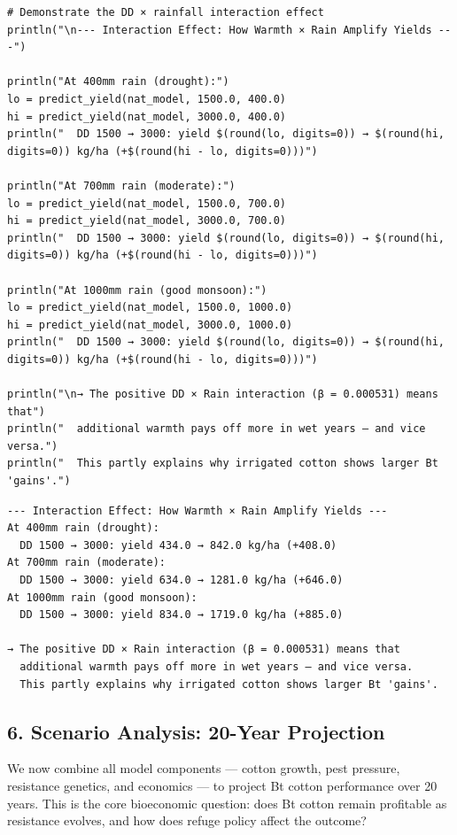 \begin{verbatim}
# Demonstrate the DD × rainfall interaction effect
println("\n--- Interaction Effect: How Warmth × Rain Amplify Yields ---")

println("At 400mm rain (drought):")
lo = predict_yield(nat_model, 1500.0, 400.0)
hi = predict_yield(nat_model, 3000.0, 400.0)
println("  DD 1500 → 3000: yield $(round(lo, digits=0)) → $(round(hi, digits=0)) kg/ha (+$(round(hi - lo, digits=0)))")

println("At 700mm rain (moderate):")
lo = predict_yield(nat_model, 1500.0, 700.0)
hi = predict_yield(nat_model, 3000.0, 700.0)
println("  DD 1500 → 3000: yield $(round(lo, digits=0)) → $(round(hi, digits=0)) kg/ha (+$(round(hi - lo, digits=0)))")

println("At 1000mm rain (good monsoon):")
lo = predict_yield(nat_model, 1500.0, 1000.0)
hi = predict_yield(nat_model, 3000.0, 1000.0)
println("  DD 1500 → 3000: yield $(round(lo, digits=0)) → $(round(hi, digits=0)) kg/ha (+$(round(hi - lo, digits=0)))")

println("\n→ The positive DD × Rain interaction (β = 0.000531) means that")
println("  additional warmth pays off more in wet years — and vice versa.")
println("  This partly explains why irrigated cotton shows larger Bt 'gains'.")
\end{verbatim}




\begin{verbatim}
--- Interaction Effect: How Warmth × Rain Amplify Yields ---
At 400mm rain (drought):
  DD 1500 → 3000: yield 434.0 → 842.0 kg/ha (+408.0)
At 700mm rain (moderate):
  DD 1500 → 3000: yield 634.0 → 1281.0 kg/ha (+646.0)
At 1000mm rain (good monsoon):
  DD 1500 → 3000: yield 834.0 → 1719.0 kg/ha (+885.0)

→ The positive DD × Rain interaction (β = 0.000531) means that
  additional warmth pays off more in wet years — and vice versa.
  This partly explains why irrigated cotton shows larger Bt 'gains'.
\end{verbatim}



\subsection{6. Scenario Analysis: 20-Year Projection}



\label{15337249543564275832}{}


We now combine all model components — cotton growth, pest pressure, resistance genetics, and economics — to project Bt cotton performance over 20 years. This is the core bioeconomic question: does Bt cotton remain profitable as resistance evolves, and how does refuge policy affect the outcome?



